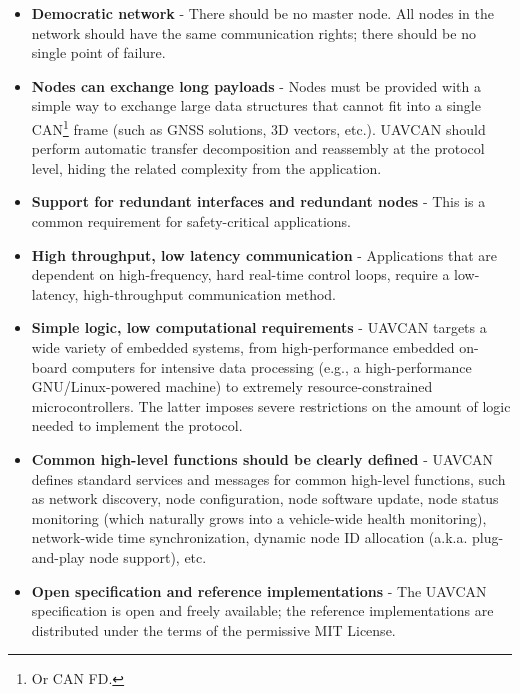 \begin{itemize}
    \item \textbf{Democratic network} - There should be no master node.
    All nodes in the network should have the same communication rights; there should be no single point of failure.

    \item \textbf{Nodes can exchange long payloads} - Nodes must be provided with a simple way to exchange large
    data structures that cannot fit into a single CAN\footnote{Or CAN FD.}
    frame (such as GNSS solutions, 3D vectors, etc.).
    UAVCAN should perform automatic transfer decomposition and reassembly at the protocol level,
    hiding the related complexity from the application.

    \item \textbf{Support for redundant interfaces and redundant nodes} - This is a common requirement for
    safety-critical applications.

    \item \textbf{High throughput, low latency communication} - Applications that are dependent on high-frequency,
    hard real-time control loops, require a low-latency, high-throughput communication method.

    \item \textbf{Simple logic, low computational requirements} - UAVCAN targets a wide variety of embedded systems,
    from high-performance embedded on-board computers for intensive data processing
    (e.g., a high-performance GNU/Linux-powered machine) to extremely resource-constrained microcontrollers.
    The latter imposes severe restrictions on the amount of logic needed to implement the protocol.

    \item \textbf{Common high-level functions should be clearly defined} - UAVCAN defines standard services
    and messages for common high-level functions, such as network discovery, node configuration,
    node software update, node status monitoring (which naturally grows into a vehicle-wide health monitoring),
    network-wide time synchronization, dynamic node ID allocation (a.k.a. plug-and-play node support), etc.

    \item \textbf{Open specification and reference implementations} - The UAVCAN specification is open and
    freely available; the reference implementations are distributed under the terms of the permissive MIT License.
\end{itemize}


